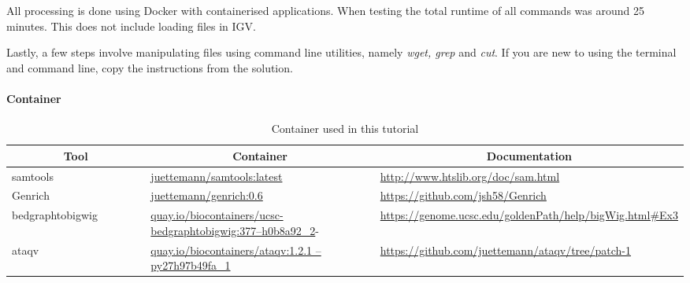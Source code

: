 \documentclass[12pt]{article}
\begin{document}
	\vspace{0.5cm}
		
	All processing is done using Docker with containerised applications. 
	When testing the total runtime of all commands was around 25 minutes. 
	This does not include loading files in IGV.

\vspace{0.5cm}

	Lastly, a few steps involve manipulating files using command line utilities, namely \textit{wget, grep} and \textit{cut}. 
	If you are new to using the terminal and command line, copy the instructions from the solution.
	

		\paragraph{Container}

			\begin{table}[H]
				\begin{center}
					\begin{adjustbox}{width=1\textwidth}
						\begin{tabular}{p{0.25\linewidth} | p{0.4\linewidth} | p{0.45\linewidth}}
							
							\multicolumn{1}{c}{ \textbf{Tool}} & \multicolumn{1}{c}{\textbf{Container}} & \multicolumn{1}{c}{\textbf{Documentation}} \\
							\hline
							samtools & \href{https://hub.docker.com/repository/docker/juettemann/samtools}{juettemann/samtools:latest} & \url{http://www.htslib.org/doc/sam.html} \\
							\hline
							Genrich & \href{https://hub.docker.com/repository/docker/juettemann/genrich}{juettemann/genrich:0.6} & \url{https://github.com/jsh58/Genrich}\\
							\hline
							bedgraphtobigwig & \href{https://quay.io/repository/biocontainers/ucsc-bedgraphtobigwig}{quay.io/biocontainers/ucsc-bedgraphtobigwig:377–h0b8a92\_2}- & \url{https://genome.ucsc.edu/goldenPath/help/bigWig.html#Ex3}\\
							\hline
							ataqv & \href{https://quay.io/repository/biocontainers/ataqv?tag=1.2.1-py27h97b49fa_1}{quay.io/biocontainers/ataqv:1.2.1
								–py27h97b49fa\_1} & \url{https://github.com/juettemann/ataqv/tree/patch-1} \\
							\hline
						\end{tabular}
					\end{adjustbox}
					\caption[Container]{Container used in this tutorial }
					\label{table:genrich}
				\end{center}
			\end{table}
\end{document}
